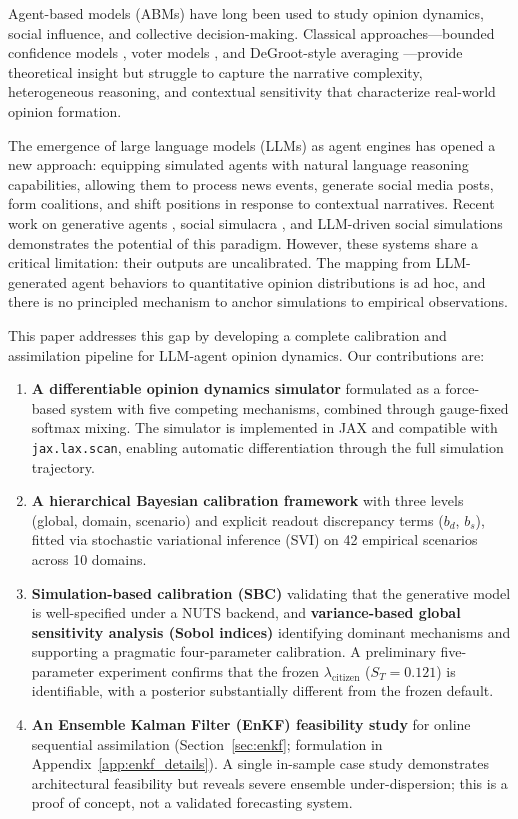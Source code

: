\documentclass[12pt]{article}
\begin{document}
Agent-based models (ABMs) have long been used to study opinion dynamics, social influence, and collective decision-making. Classical approaches---bounded confidence models \citep{hegselmann2002}, voter models \citep{holley1975}, and DeGroot-style averaging \citep{degroot1974}---provide theoretical insight but struggle to capture the narrative complexity, heterogeneous reasoning, and contextual sensitivity that characterize real-world opinion formation.

The emergence of large language models (LLMs) as agent engines has opened a new approach: equipping simulated agents with natural language reasoning capabilities, allowing them to process news events, generate social media posts, form coalitions, and shift positions in response to contextual narratives. Recent work on generative agents \citep{park2023}, social simulacra \citep{park2022}, and LLM-driven social simulations \citep{gao2023} demonstrates the potential of this paradigm. However, these systems share a critical limitation: their outputs are uncalibrated. The mapping from LLM-generated agent behaviors to quantitative opinion distributions is ad hoc, and there is no principled mechanism to anchor simulations to empirical observations.

This paper addresses this gap by developing a complete calibration and assimilation pipeline for LLM-agent opinion dynamics. Our contributions are:

\begin{enumerate}
    \item \textbf{A differentiable opinion dynamics simulator} formulated as a force-based system with five competing mechanisms, combined through gauge-fixed softmax mixing. The simulator is implemented in JAX and compatible with \texttt{jax.lax.scan}, enabling automatic differentiation through the full simulation trajectory.

    \item \textbf{A hierarchical Bayesian calibration framework} with three levels (global, domain, scenario) and explicit readout discrepancy terms ($b_d$, $b_s$), fitted via stochastic variational inference (SVI) on 42 empirical scenarios across 10 domains.

    \item \textbf{Simulation-based calibration (SBC)} validating that the generative model is well-specified under a NUTS backend, and \textbf{variance-based global sensitivity analysis (Sobol indices)} identifying dominant mechanisms and supporting a pragmatic four-parameter calibration. A preliminary five-parameter experiment confirms that the frozen $\lambda_{\text{citizen}}$ ($S_T = 0.121$) is identifiable, with a posterior substantially different from the frozen default.

    \item \textbf{An Ensemble Kalman Filter (EnKF) feasibility study} for online sequential assimilation (Section~\ref{sec:enkf}; formulation in Appendix~\ref{app:enkf_details}). A single in-sample case study demonstrates architectural feasibility but reveals severe ensemble under-dispersion; this is a proof of concept, not a validated forecasting system.
\end{enumerate}
\end{document}
